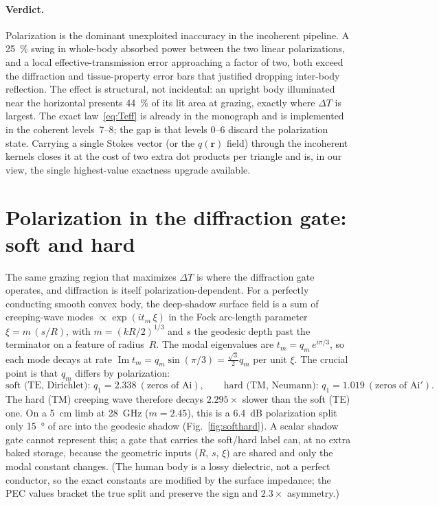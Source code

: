 \documentclass[11pt]{article}
\newcommand{\rr}{\ensuremath{\mathbf{r}}}
\begin{document}
\paragraph{Verdict.} Polarization is the dominant unexploited inaccuracy in
the incoherent pipeline. A \SI{25}{\percent} swing in whole-body absorbed
power between the two linear polarizations, and a local effective-transmission
error approaching a factor of two, both exceed the diffraction and
tissue-property error bars that justified dropping inter-body reflection.
The effect is structural, not incidental: an upright body illuminated near
the horizontal presents \SI{44}{\percent} of its lit area at grazing, exactly
where $\Delta T$ is largest. The exact law~\eqref{eq:Teff} is already in the
monograph and is implemented in the coherent levels~7--8; the gap is that
levels 0--6 discard the polarization state. Carrying a single Stokes vector
(or the $q(\rr)$ field) through the incoherent kernels closes it at the cost
of two extra dot products per triangle and is, in our view, the single
highest-value exactness upgrade available.

\section{Polarization in the diffraction gate: soft and hard}

The same grazing region that maximizes $\Delta T$ is where the diffraction
gate operates, and diffraction is itself polarization-dependent. For a
perfectly conducting smooth convex body, the deep-shadow surface field is a
sum of creeping-wave modes $\propto \exp(i t_m\,\xi)$ in the Fock arc-length
parameter $\xi = m\,(s/R)$, with $m=(kR/2)^{1/3}$ and $s$ the geodesic depth
past the terminator on a feature of radius~$R$. The modal eigenvalues are
$t_m = q_m\,e^{i\pi/3}$, so each mode decays at rate
$\operatorname{Im} t_m = q_m\sin(\pi/3) = \tfrac{\sqrt3}{2}q_m$ per unit
$\xi$. The crucial point is that $q_m$ differs by polarization:
\begin{equation}
  \text{soft (TE, Dirichlet): } q_1 = 2.338\ (\text{zeros of } \mathrm{Ai}),
  \qquad
  \text{hard (TM, Neumann): } q_1 = 1.019\ (\text{zeros of } \mathrm{Ai}').
\end{equation}
The hard (TM) creeping wave therefore decays $2.295\times$ slower than the
soft (TE) one. On a \SI{5}{\cm} limb at \SI{28}{\GHz} ($m=2.45$), this is a
\SI{6.4}{\dB} polarization split only \SI{15}{\degree} of arc into the
geodesic shadow (Fig.~\ref{fig:softhard}). A scalar shadow gate cannot
represent this; a gate that carries the soft/hard label can, at no extra
baked storage, because the geometric inputs ($R$, $s$, $\xi$) are shared and
only the modal constant changes. (The human body is a lossy dielectric, not
a perfect conductor, so the exact constants are modified by the surface
impedance; the PEC values bracket the true split and preserve the sign and
$2.3\times$ asymmetry.)
\end{document}
